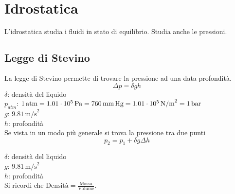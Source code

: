 
\section{Idrostatica}
L'idrostatica studia i fluidi in stato di equilibrio. Studia anche le pressioni.
\subsection{Legge di Stevino}
La legge di Stevino permette di trovare la pressione ad una data profondità.
\begin{equation*}
  \Delta p = \delta gh
\end{equation*}
$\delta$: densità del liquido\\
\hyperref[tab:patm]{$p_{atm}$}: $1\,\text{atm} = 1.01\cdot10^5\,\text{Pa} = 760\,\text{mm\,Hg} = 
1.01\cdot10^5\,\text{N/m}^2 = 1\,\text{bar}$\\
\hyperref[tab:g]{$g$}: $9.81\,\text{m/s}^2$\\
$h$: profondità\\[\baselineskip]
Se vista in un modo più generale si trova la pressione tra due punti
\begin{equation*}
  p_2 = p_1 + \delta g\Delta h
\end{equation*}
\begin{center}
\end{center}

$\delta$: densità del liquido\\
\hyperref[tab:g]{$g$}: $9.81\,\text{m/s}^2$\\
$h$: profondità\\ [\baselineskip]

Si ricordi che $\text{Densità}=\frac{\text{Massa}}{\text{Volume}}$.

